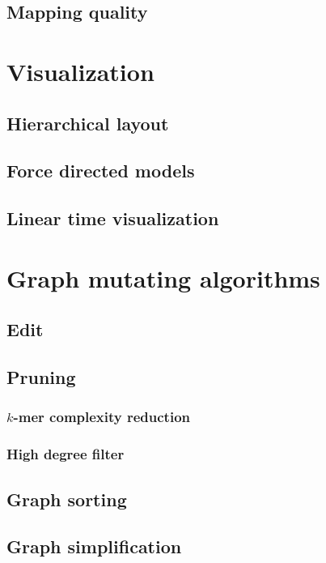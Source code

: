 \subsection{Mapping quality}


\section{Visualization}

\subsection{Hierarchical layout}

\subsection{Force directed models}

\subsection{Linear time visualization}


\section{Graph mutating algorithms}

\subsection{Edit}

\subsection{Pruning}
\subsubsection{$k$-mer complexity reduction}
\subsubsection{High degree filter}

\subsection{Graph sorting}

\subsection{Graph simplification}


